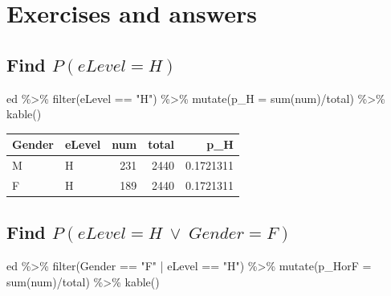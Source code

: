 \documentclass[
  letterpaper,
]{book}
\newenvironment{Shaded}{\begin{snugshade}}{\end{snugshade}}
\newcommand{\AttributeTok}[1]{\textcolor[rgb]{0.40,0.45,0.13}{#1}}
\newcommand{\FunctionTok}[1]{\textcolor[rgb]{0.28,0.35,0.67}{#1}}
\newcommand{\NormalTok}[1]{\textcolor[rgb]{0.00,0.23,0.31}{#1}}
\newcommand{\SpecialCharTok}[1]{\textcolor[rgb]{0.37,0.37,0.37}{#1}}
\newcommand{\StringTok}[1]{\textcolor[rgb]{0.13,0.47,0.30}{#1}}
\begin{document}
\hypertarget{exercises-and-answers}{%
\section{Exercises and answers}\label{exercises-and-answers}}

\hypertarget{find-pelevel-h}{%
\subsection{\texorpdfstring{Find
\(P(eLevel = H)\)}{Find P(eLevel = H)}}\label{find-pelevel-h}}

\begin{Shaded}
\begin{Highlighting}[]
\NormalTok{ed }\SpecialCharTok{\%\textgreater{}\%}
  \FunctionTok{filter}\NormalTok{(eLevel }\SpecialCharTok{==} \StringTok{"H"}\NormalTok{) }\SpecialCharTok{\%\textgreater{}\%}
  \FunctionTok{mutate}\NormalTok{(}\AttributeTok{p\_H =} \FunctionTok{sum}\NormalTok{(num)}\SpecialCharTok{/}\NormalTok{total) }\SpecialCharTok{\%\textgreater{}\%}
  \FunctionTok{kable}\NormalTok{()}
\end{Highlighting}
\end{Shaded}

\begin{longtable}[]{@{}llrrr@{}}
\toprule()
Gender & eLevel & num & total & p\_H \\
\midrule()
\endhead
M & H & 231 & 2440 & 0.1721311 \\
F & H & 189 & 2440 & 0.1721311 \\
\bottomrule()
\end{longtable}

\hypertarget{find-pelevel-h-vee-gender-f}{%
\subsection{\texorpdfstring{Find
\(P(eLevel = H\ \vee \ Gender = F)\)}{Find P(eLevel = H\textbackslash{} \textbackslash vee \textbackslash{} Gender = F)}}\label{find-pelevel-h-vee-gender-f}}

\begin{Shaded}
\begin{Highlighting}[]
\NormalTok{ed }\SpecialCharTok{\%\textgreater{}\%}
  \FunctionTok{filter}\NormalTok{(Gender }\SpecialCharTok{==} \StringTok{"F"} \SpecialCharTok{|}\NormalTok{ eLevel }\SpecialCharTok{==} \StringTok{"H"}\NormalTok{) }\SpecialCharTok{\%\textgreater{}\%}
  \FunctionTok{mutate}\NormalTok{(}\AttributeTok{p\_HorF =} \FunctionTok{sum}\NormalTok{(num)}\SpecialCharTok{/}\NormalTok{total) }\SpecialCharTok{\%\textgreater{}\%}
  \FunctionTok{kable}\NormalTok{()}
\end{Highlighting}
\end{Shaded}
\end{document}
